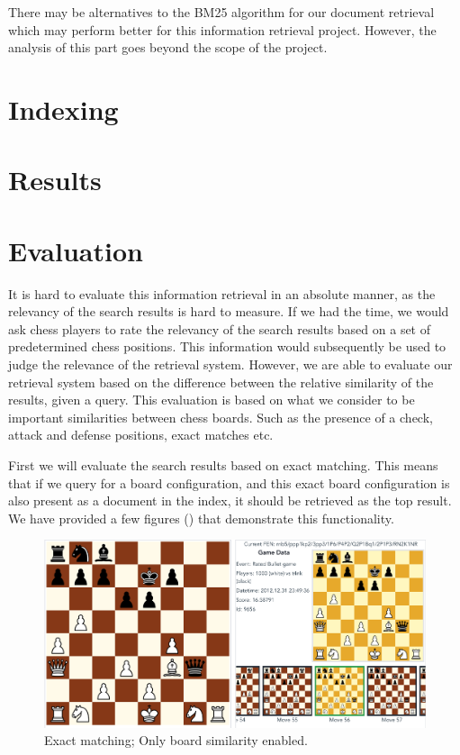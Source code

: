 \documentclass[11pt]{article}
\begin{document}

    There may be alternatives to the BM25 algorithm for our document retrieval which may perform better for this information retrieval project. However, the analysis of this part goes beyond the scope of the project.




    \section{Indexing}


    \section{Results}


    \section{Evaluation}

    It is hard to evaluate this information retrieval in an absolute manner, as the relevancy of the search results is hard to measure. If we had the time, we would ask chess players to rate the relevancy of the search results based on a set of predetermined chess positions. This information would subsequently be used to judge the relevance of the retrieval system. However, we are able to evaluate our retrieval system based on the difference between the relative similarity of the results, given a query. This evaluation is based on what we consider to be important similarities between chess boards. Such as the presence of a check, attack and defense positions, exact matches etc.

    First we will evaluate the search results based on exact matching. This means that if we query for a board configuration, and this exact board configuration is also present as a document in the index, it should be retrieved as the top result. We have provided a few figures () that demonstrate this functionality.

    \begin{figure}[H]
        \centering
        \includegraphics[width=14cm]{images/ExactMatch1-Bo}
        \caption{Exact matching; Only board similarity enabled.}
        \label{fig:ExactMatch1-Bo}
    \end{figure}
\end{document}
